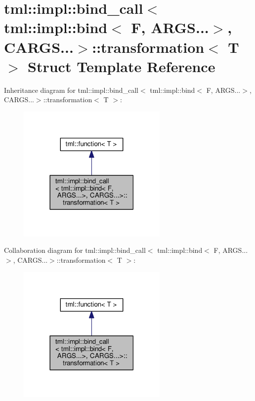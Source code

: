 \hypertarget{structtml_1_1impl_1_1bind__call_3_01tml_1_1impl_1_1bind_3_01_f_00_01_a_r_g_s_8_8_8_4_00_01_c_a_r_g_s_8_8_8_4_1_1transformation}{\section{tml\+:\+:impl\+:\+:bind\+\_\+call$<$ tml\+:\+:impl\+:\+:bind$<$ F, A\+R\+G\+S...$>$, C\+A\+R\+G\+S...$>$\+:\+:transformation$<$ T $>$ Struct Template Reference}
\label{structtml_1_1impl_1_1bind__call_3_01tml_1_1impl_1_1bind_3_01_f_00_01_a_r_g_s_8_8_8_4_00_01_c_a_r_g_s_8_8_8_4_1_1transformation}
}


Inheritance diagram for tml\+:\+:impl\+:\+:bind\+\_\+call$<$ tml\+:\+:impl\+:\+:bind$<$ F, A\+R\+G\+S...$>$, C\+A\+R\+G\+S...$>$\+:\+:transformation$<$ T $>$\+:
\nopagebreak
\begin{figure}[H]
\begin{center}
\leavevmode
\includegraphics[width=206pt]{structtml_1_1impl_1_1bind__call_3_01tml_1_1impl_1_1bind_3_01_f_00_01_a_r_g_s_8_8_8_4_00_01_c_a_r1f341c285c92306e73b4f64903822e53}
\end{center}
\end{figure}


Collaboration diagram for tml\+:\+:impl\+:\+:bind\+\_\+call$<$ tml\+:\+:impl\+:\+:bind$<$ F, A\+R\+G\+S...$>$, C\+A\+R\+G\+S...$>$\+:\+:transformation$<$ T $>$\+:
\nopagebreak
\begin{figure}[H]
\begin{center}
\leavevmode
\includegraphics[width=206pt]{structtml_1_1impl_1_1bind__call_3_01tml_1_1impl_1_1bind_3_01_f_00_01_a_r_g_s_8_8_8_4_00_01_c_a_rbac3f6cae366eae3a3a8819131e2e267}
\end{center}
\end{figure}
